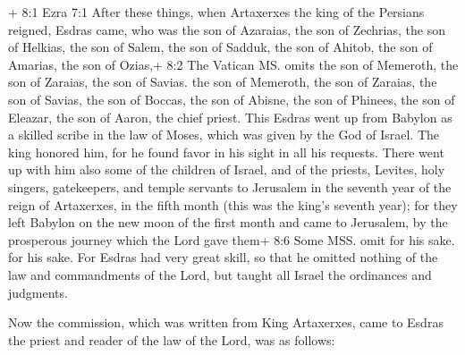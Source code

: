  + 8:1 Ezra 7:1 After these things, when Artaxerxes the king
of the Persians reigned, Esdras came, who was the son of Azaraias, the
son of Zechrias, the son of Helkias, the son of Salem,  the
son of Sadduk, the son of Ahitob, the son of Amarias, the son of Ozias,+
8:2 The Vatican MS. omits the son of Memeroth, the son of Zaraias, the
son of Savias. the son of Memeroth, the son of Zaraias, the son of
Savias, the son of Boccas, the son of Abisne, the son of Phinees, the
son of Eleazar, the son of Aaron, the chief priest.  This
Esdras went up from Babylon as a skilled scribe in the law of Moses,
which was given by the God of Israel.  The king honored him,
for he found favor in his sight in all his requests.  There
went up with him also some of the children of Israel, and of the
priests, Levites, holy singers, gatekeepers, and temple servants to
Jerusalem  in the seventh year of the reign of Artaxerxes,
in the fifth month (this was the king's seventh year); for they left
Babylon on the new moon of the first month and came to Jerusalem, by the
prosperous journey which the Lord gave them+ 8:6 Some MSS. omit for his
sake. for his sake.  For Esdras had very great skill, so
that he omitted nothing of the law and commandments of the Lord, but
taught all Israel the ordinances and judgments.

 Now the commission, which was written from King Artaxerxes,
came to Esdras the priest and reader of the law of the Lord, was as
follows:

